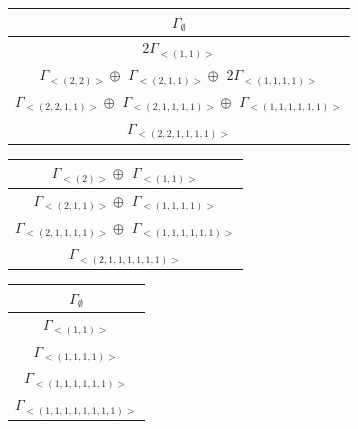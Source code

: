 \bigskip
\begin{minipage}{.6\textwidth}
\centering
\begin{tabular}{|c|}\hline
$\Gamma_\emptyset$
\\ \hline
$ 2 \Gamma_{<(
1 , 
1
)>}$
\\ \hline
$\Gamma_{<(
2 , 
2
)>} \oplus$
$\Gamma_{<(
2 , 
1 , 
1
)>} \oplus$
$ 2 \Gamma_{<(
1 , 
1 , 
1 , 
1
)>}$
\\ \hline
$\Gamma_{<(
2 , 
2 , 
1 , 
1
)>} \oplus$
$\Gamma_{<(
2 , 
1 , 
1 , 
1 , 
1
)>} \oplus$
$\Gamma_{<(
1 , 
1 , 
1 , 
1 , 
1 , 
1
)>}$
\\ \hline
$\Gamma_{<(
2 , 
2 , 
1 , 
1 , 
1 , 
1
)>}$
\\
\hline\end{tabular}\end{minipage}
\begin{minipage}{.4\textwidth}
\centering
\begin{tabular}{|c|}\hline
$\Gamma_{<(
2
)>} \oplus$
$\Gamma_{<(
1 , 
1
)>}$
\\ \hline
$\Gamma_{<(
2 , 
1 , 
1
)>} \oplus$
$\Gamma_{<(
1 , 
1 , 
1 , 
1
)>}$
\\ \hline
$\Gamma_{<(
2 , 
1 , 
1 , 
1 , 
1
)>} \oplus$
$\Gamma_{<(
1 , 
1 , 
1 , 
1 , 
1 , 
1
)>}$
\\ \hline
$\Gamma_{<(
2 , 
1 , 
1 , 
1 , 
1 , 
1 , 
1
)>}$
\\
\hline\end{tabular}\end{minipage}
\bigskip
\begin{minipage}{1\textwidth}
\centering
\begin{tabular}{|c|}\hline
$\Gamma_\emptyset$
\\ \hline
$\Gamma_{<(
1 , 
1
)>}$
\\ \hline
$\Gamma_{<(
1 , 
1 , 
1 , 
1
)>}$
\\ \hline
$\Gamma_{<(
1 , 
1 , 
1 , 
1 , 
1 , 
1
)>}$
\\ \hline
$\Gamma_{<(
1 , 
1 , 
1 , 
1 , 
1 , 
1 , 
1 , 
1
)>}$
\\
\hline\end{tabular}\end{minipage}
\\




